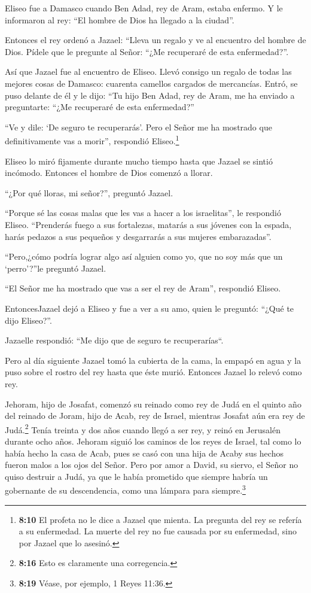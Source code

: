  Eliseo fue a Damasco cuando Ben Adad, rey de Aram, estaba
enfermo. Y le informaron al rey: ``El hombre de Dios ha llegado a la
ciudad''.

 Entonces el rey ordenó a Jazael: ``Lleva un regalo y ve al
encuentro del hombre de Dios. Pídele que le pregunte al Señor: ``¿Me
recuperaré de esta enfermedad?''.

 Así que Jazael fue al encuentro de Eliseo. Llevó consigo un
regalo de todas las mejores cosas de Damasco: cuarenta camellos cargados
de mercancías. Entró, se puso delante de él y le dijo: ``Tu hijo Ben
Adad, rey de Aram, me ha enviado a preguntarte: ``¿Me recuperaré de esta
enfermedad?''

 ``Ve y dile: `De seguro te recuperarás'. Pero el Señor me
ha mostrado que definitivamente vas a morir'', respondió
Eliseo.\footnote{\textbf{8:10} El profeta no le dice a Jazael que
  mienta. La pregunta del rey se refería a su enfermedad. La muerte del
  rey no fue causada por su enfermedad, sino por Jazael que lo asesinó.}

 Eliseo lo miró fijamente durante mucho tiempo hasta que
Jazael se sintió incómodo. Entonces el hombre de Dios comenzó a llorar.

 ``¿Por qué lloras, mi señor?'', preguntó Jazael.

``Porque sé las cosas malas que les vas a hacer a los israelitas'', le
respondió Eliseo. ``Prenderás fuego a sus fortalezas, matarás a sus
jóvenes con la espada, harás pedazos a sus pequeños y desgarrarás a sus
mujeres embarazadas''.

 ``Pero,¿cómo podría lograr algo así alguien como yo, que
no soy más que un `perro'?''le preguntó Jazael.

``El Señor me ha mostrado que vas a ser el rey de Aram'', respondió
Eliseo.

 EntoncesJazael dejó a Eliseo y fue a ver a su amo, quien
le preguntó: ``¿Qué te dijo Eliseo?''.

Jazaelle respondió: ``Me dijo que de seguro te recuperarías``.

 Pero al día siguiente Jazael tomó la cubierta de la cama,
la empapó en agua y la puso sobre el rostro del rey hasta que éste
murió. Entonces Jazael lo relevó como rey.

 Jehoram, hijo de Josafat, comenzó su reinado como rey de
Judá en el quinto año del reinado de Joram, hijo de Acab, rey de Israel,
mientras Josafat aún era rey de Judá.\footnote{\textbf{8:16} Esto es
  claramente una corregencia.}  Tenía treinta y dos años
cuando llegó a ser rey, y reinó en Jerusalén durante ocho años.
 Jehoram siguió los caminos de los reyes de Israel, tal
como lo había hecho la casa de Acab, pues se casó con una hija de Acaby
sus hechos fueron malos a los ojos del Señor.  Pero por
amor a David, su siervo, el Señor no quiso destruir a Judá, ya que le
había prometido que siempre habría un gobernante de su descendencia,
como una lámpara para siempre.\footnote{\textbf{8:19} Véase, por
  ejemplo, 1 Reyes 11:36.}

